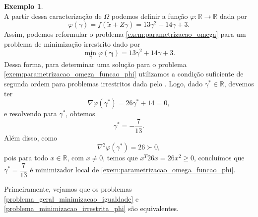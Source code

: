 \documentclass[12pt,a4paper]{scrartcl}
\def\RR{\mathds{R}}
\theoremstyle{definition}%
\newtheorem{exem}{Exemplo}
\begin{document}
\begin{exem}
\[\]
A partir dessa caracterização de $\Omega$ podemos definir a função $\varphi : \RR \rightarrow \RR$ dada por 
\[
\varphi(\gamma) = f(\tilde{x} + Z\gamma) = 13\gamma^{2} + 14\gamma +3 .
\]
Assim, podemos reformular o problema \eqref{exem:parametrizacao_omega} para um problema de minimização irrestrito dado por
\[ \label{exem:parametrizacao_omega_funcao_phi}
\min_{\boldsymbol{\gamma}} \varphi (\boldsymbol{\gamma}) = 13\gamma^{2} + 14\gamma +3 .
\]
Dessa forma, para determinar uma solução para o problema \eqref{exem:parametrizacao_omega_funcao_phi} utilizamos a condição suficiente de segunda ordem para problemas irrestritos dada pelo . Logo, dado $\gamma^{*} \in \RR$, devemos ter
\[
\nabla \varphi(\gamma^{*}) = 26 \gamma^{*} +14 = 0 ,
\]
e resolvendo para $\gamma^{*}$, obtemos
\[
\gamma^{*} = - \dfrac{7}{13} .
\]
Além disso, como
\[
\nabla^{2} \varphi(\gamma^{*}) = 26 \succ 0 ,
\]
pois para todo $x\in \RR$, com $x\neq 0$, temos que $x^{T}26x = 26x^{2} \geq 0$, concluímos que $\gamma^{*} =  \dfrac{7}{13}$ é minimizador local de \eqref{exem:parametrizacao_omega_funcao_phi}.
\end{exem}

Primeiramente, vejamos que os problemas \eqref{problema_geral_minimizacao_igualdade} e \eqref{problema_minimizacao_irrestrita_phi} são equivalentes.
\end{document}

